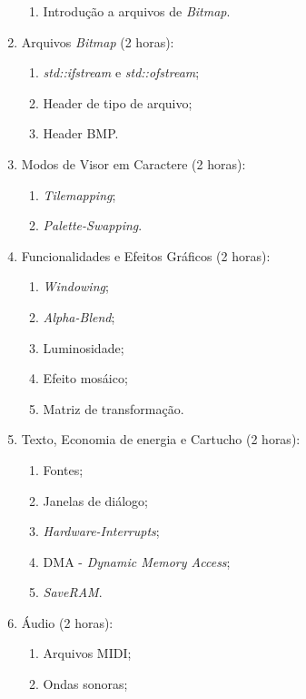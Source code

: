 \documentclass{article}
\begin{document}
\begin{enumerate}
\begin{enumerate}
                \item Introdução a arquivos de \textit{Bitmap}.
        \end{enumerate}
    \item Arquivos \textit{Bitmap} (2 horas):
        \begin{enumerate}
                \item \textit{std::ifstream} e \textit{std::ofstream};
                \item Header de tipo de arquivo;
                \item Header BMP.
        \end{enumerate}
    \item Modos de Visor em Caractere (2 horas):
        \begin{enumerate}
                \item \textit{Tilemapping};
                \item \textit{Palette-Swapping}.
        \end{enumerate}
    \item Funcionalidades e Efeitos Gráficos (2 horas):
        \begin{enumerate}
                \item \textit{Windowing};
                \item \textit{Alpha-Blend};
                \item Luminosidade;
                \item Efeito mosáico;
                \item Matriz de transformação.
        \end{enumerate}
    \item Texto, Economia de energia e Cartucho (2 horas):
        \begin{enumerate}
                \item Fontes;
                \item Janelas de diálogo;
                \item \textit{Hardware-Interrupts};
                \item DMA - \textit{Dynamic Memory Access};
                \item \textit{SaveRAM}.
        \end{enumerate}
    \item Áudio (2 horas):
        \begin{enumerate}
                \item Arquivos MIDI;
                \item Ondas sonoras;

\end{enumerate}
\end{enumerate}
\end{document}
